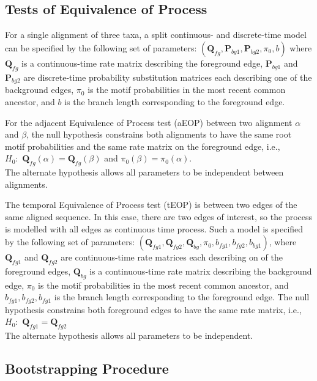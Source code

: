 

\subsection{Tests of Equivalence of Process}

For a single alignment of three taxa, a split continuous- and discrete-time model can be specified by the following set of parameters: $( \bm{Q}_{fg}, \bm{P}_{bg1}, \bm{P}_{bg2}, \pi_{0}, b ) $ where $\bm{Q}_{fg}$ is a continuous-time rate matrix describing the foreground edge,  $\bm{P}_{bg1}$ and $\bm{P}_{bg2}$ are discrete-time probability substitution matrices each describing one of the background edges, $\pi_{0}$ is the motif probabilities in the most recent common ancestor, and $b$ is the branch length corresponding to the foreground edge. 

For the adjacent Equivalence of Process test (aEOP) between two alignment $\alpha$ and $\beta$, the null hypothesis constrains both alignments to have the same root motif probabilities and the same rate matrix on the foreground edge, i.e.,  \\
$H_0:$ $\bm{Q}_{fg}(\alpha) = \bm{Q}_{fg}(\beta)$ and $\pi_0(\beta) = \pi_0(\alpha)$. \\
\noindent
The alternate hypothesis allows all parameters to be independent between alignments. 

The temporal Equivalence of Process test (tEOP) is between two edges of the same aligned sequence. In this case, there are two edges of interest, so the process is modelled with all edges as continuous time process. Such a model is specified by the following set of parameters: $( \bm{Q}_{fg1}, \bm{Q}_{fg2}, \bm{Q}_{bg}, \pi_{0}, b_{fg1}, b_{fg2}, b_{bg1}) $, where $\bm{Q}_{fg1}$ and $\bm{Q}_{fg2}$ are continuous-time rate matrices each describing on of the foreground edges,  $\bm{Q}_{bg}$ is a continuous-time rate matrix describing the background edge, $\pi_{0}$ is the motif probabilities in the most recent common ancestor, and $ b_{fg1}, b_{fg2}, b_{fg1}$ is the branch length corresponding to the foreground edge. The null hypothesis constrains both foreground edges to have the same rate matrix, i.e., \\
$H_0:$ $\bm{Q}_{fg1} = \bm{Q}_{fg2}$  \\ 
The alternate hypothesis allows all parameters to be independent. 

\subsection{Bootstrapping Procedure}

